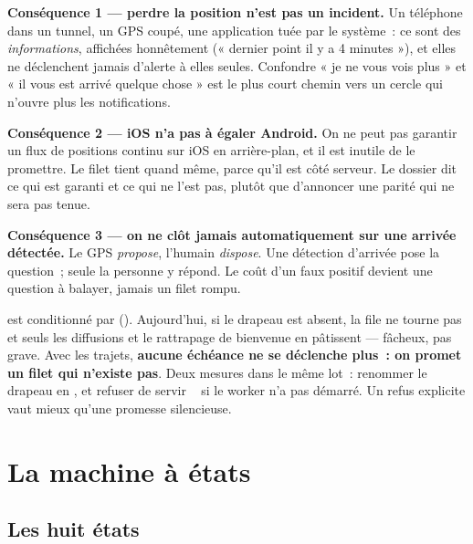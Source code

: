 \textbf{Conséquence 1 --- perdre la position n'est pas un incident.} Un téléphone dans un
tunnel, un GPS coupé, une application tuée par le système~: ce sont des \emph{informations},
affichées honnêtement (« dernier point il y a 4 minutes »), et elles ne déclenchent jamais
d'alerte à elles seules. Confondre « je ne vous vois plus » et « il vous est arrivé quelque
chose » est le plus court chemin vers un cercle qui n'ouvre plus les notifications.

\textbf{Conséquence 2 --- iOS n'a pas à égaler Android.} On ne peut pas garantir un flux de
positions continu sur iOS en arrière-plan, et il est inutile de le promettre. Le filet tient
quand même, parce qu'il est côté serveur. Le dossier dit ce qui est garanti et ce qui ne
l'est pas, plutôt que d'annoncer une parité qui ne sera pas tenue.

\textbf{Conséquence 3 --- on ne clôt jamais automatiquement sur une arrivée détectée.} Le
GPS \emph{propose}, l'humain \emph{dispose}. Une détection d'arrivée pose la question~; seule
la personne y répond. Le coût d'un faux positif devient une question à balayer, jamais un
filet rompu.

\begin{alerte}
 est conditionné par 
(). Aujourd'hui, si le drapeau est absent, la file ne tourne
pas et seuls les diffusions et le rattrapage de bienvenue en pâtissent --- fâcheux, pas
grave. Avec les trajets, \textbf{aucune échéance ne se déclenche plus~: on promet un filet
qui n'existe pas}. Deux mesures dans le même lot~: renommer le drapeau en
, et refuser de servir \mPOST{}~ si le worker
n'a pas démarré. Un refus explicite vaut mieux qu'une promesse silencieuse.
\end{alerte}

\chapter{La machine à états}

\section{Les huit états}

